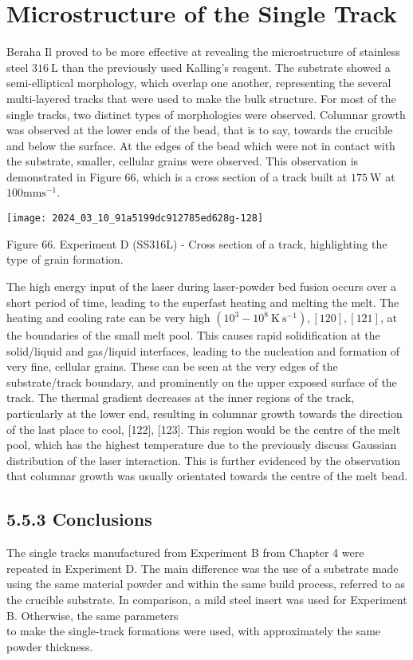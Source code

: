 \documentclass[10pt]{article}
\begin{document}
\section*{Microstructure of the Single Track}
Beraha Il proved to be more effective at revealing the microstructure of stainless steel $316 \mathrm{~L}$ than the previously used Kalling's reagent. The substrate showed a semi-elliptical morphology, which overlap one another, representing the several multi-layered tracks that were used to make the bulk structure. For most of the single tracks, two distinct types of morphologies were observed. Columnar growth was observed at the lower ends of the bead, that is to say, towards the crucible and below the surface. At the edges of the bead which were not in contact with the substrate, smaller, cellular grains were observed. This observation is demonstrated in Figure 66, which is a cross section of a track built at $175 \mathrm{~W}$ at $100 \mathrm{mms}^{-1}$.

\begin{center}
\texttt{[image: 2024\_03\_10\_91a5199dc912785ed628g-128]}
\end{center}

Figure 66. Experiment D (SS316L) - Cross section of a track, highlighting the type of grain formation.

The high energy input of the laser during laser-powder bed fusion occurs over a short period of time, leading to the superfast heating and melting the melt. The heating and cooling rate can be very high $\left(10^{3}-10^{8} \mathrm{~K} \mathrm{~s}^{-1}\right),[120],[121]$, at the boundaries of the small melt pool. This causes rapid solidification at the solid/liquid and gas/liquid interfaces, leading to the nucleation and formation of very fine, cellular grains. These can be seen at the very edges of the substrate/track boundary, and prominently on the upper exposed surface of the track. The thermal gradient decreases at the inner regions of the track, particularly at the lower end, resulting in columnar growth towards the direction of the last place to cool, [122], [123]. This region would be the centre of the melt pool, which has the highest temperature due to the previously discuss Gaussian distribution of the laser interaction. This is further evidenced by the observation that columnar growth was usually orientated towards the centre of the melt bead.

\subsection*{5.5.3 Conclusions}
The single tracks manufactured from Experiment B from Chapter 4 were repeated in Experiment D. The main difference was the use of a substrate made using the same material powder and within the same build process, referred to as the crucible substrate. In comparison, a mild steel insert was used for Experiment B. Otherwise, the same parameters\\
to make the single-track formations were used, with approximately the same powder thickness.
\end{document}
